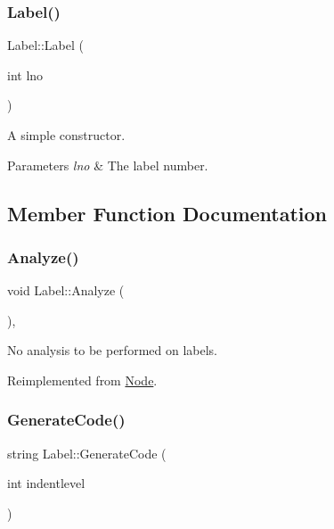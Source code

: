 \subsubsection{\texorpdfstring{Label()}{Label()}}
{\footnotesize\ttfamily Label\+::\+Label (\begin{DoxyParamCaption}\item[{int}]{lno }\end{DoxyParamCaption})}

A simple constructor. 
\begin{DoxyParams}{Parameters}
{\em lno} & The label number. \\
\hline
\end{DoxyParams}


\subsection{Member Function Documentation}
\mbox{\label{class_label_ae77a5d8983fc941f8289a8ba4e4b56c1}} 
\subsubsection{\texorpdfstring{Analyze()}{Analyze()}}
{\footnotesize\ttfamily void Label\+::\+Analyze (\begin{DoxyParamCaption}{ }\end{DoxyParamCaption})\hspace{0.3cm}{\ttfamily [inline]}, {\ttfamily [virtual]}}

No analysis to be performed on labels. 

Reimplemented from \hyperlink{class_node_a5f88d55c6f253a29def7ccc443d83d47}{Node}.

\mbox{\label{class_label_aab044ceb8b6c2ea05ab19fd68a4911c2}} 
\subsubsection{\texorpdfstring{Generate\+Code()}{GenerateCode()}}
{\footnotesize\ttfamily string Label\+::\+Generate\+Code (\begin{DoxyParamCaption}\item[{int}]{indentlevel }\end{DoxyParamCaption})\hspace{0.3cm}{\ttfamily [virtual]}}


